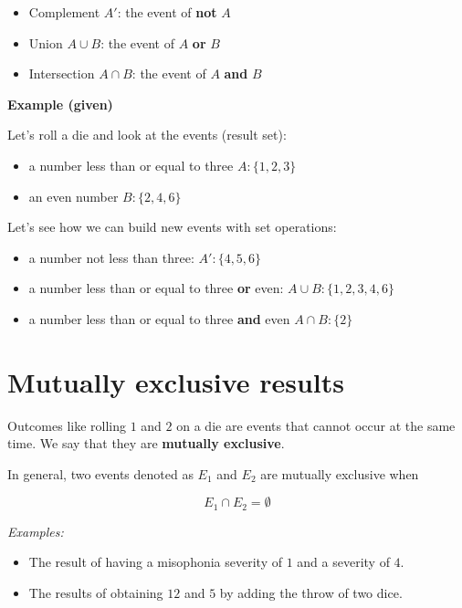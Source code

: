 \documentclass[
]{book}
\providecommand{\tightlist}{%
  \setlength{\itemsep}{0pt}\setlength{\parskip}{0pt}}
\begin{document}
\begin{itemize}
\tightlist
\item
  Complement \(A'\): the event of \textbf{not} \(A\)
\item
  Union \(A \cup B\): the event of \(A\) \textbf{or} \(B\)
\item
  Intersection \(A \cap B\): the event of \(A\) \textbf{and} \(B\)
\end{itemize}

\textbf{Example (given)}

Let's roll a die and look at the events (result set):

\begin{itemize}
\tightlist
\item
  a number less than or equal to three \(A:\{ 1,2,3\}\)
\item
  an even number \(B:\{ 2,4,6\}\)
\end{itemize}

Let's see how we can build new events with set operations:

\begin{itemize}
\tightlist
\item
  a number not less than three: \(A ':\{4,5,6\}\)
\item
  a number less than or equal to three \textbf{or} even: \(A \cup B: \{ 1,2,3,4,6\}\)
\item
  a number less than or equal to three \textbf{and} even \(A \cap B: \{ 2\}\)
\end{itemize}

\hypertarget{mutually-exclusive-results}{%
\section{Mutually exclusive results}\label{mutually-exclusive-results}}

Outcomes like rolling \(1\) and \(2\) on a die are events that cannot occur at the same time. We say that they are \textbf{mutually exclusive}.

In general, two events denoted as \(E_1\) and \(E_2\) are mutually exclusive when

\[E_1\cap E_2=\emptyset\]

\emph{Examples:}

\begin{itemize}
\item
  The result of having a misophonia severity of \(1\) and a severity of \(4\).
\item
  The results of obtaining \(12\) and \(5\) by adding the throw of two dice.
\end{itemize}
\end{document}
